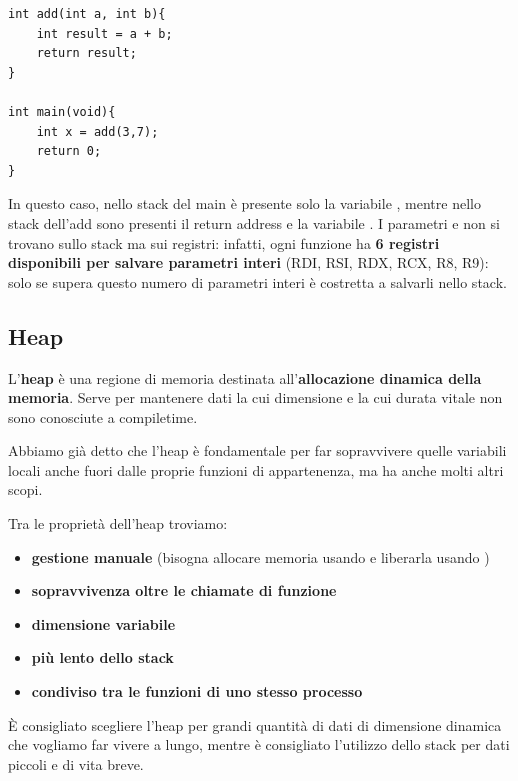 \documentclass[11pt, a4paper, titlepage, oneside]{scrbook}
\begin{document}
\begin{lstlisting}[style=C]
int add(int a, int b){
    int result = a + b;
    return result;
}

int main(void){
    int x = add(3,7);
    return 0;
}
\end{lstlisting}

In questo caso, nello stack del main è presente solo la variabile , mentre nello stack dell'add sono presenti il return address e la variabile . I parametri  e  non si trovano sullo stack ma sui registri: infatti, ogni funzione ha \textbf{6 registri disponibili per salvare parametri interi} (RDI, RSI, RDX, RCX, R8, R9): solo se supera questo numero di parametri interi è costretta a salvarli nello stack.

\subsection{Heap}

\begin{Definizione}[Heap]
\label{def-heap}
L'\textbf{heap} è una regione di memoria destinata all'\textbf{allocazione dinamica della memoria}. Serve per mantenere dati la cui dimensione e la cui durata vitale non sono conosciute a compiletime.
\end{Definizione}

Abbiamo già detto che l'heap è fondamentale per far sopravvivere quelle variabili locali anche fuori dalle proprie funzioni di appartenenza, ma ha anche molti altri scopi.

\begin{Proprieta}
\label{prop-proprieta-heap}
Tra le proprietà dell'heap troviamo:
\begin{itemize}
    \item \textbf{gestione manuale} (bisogna allocare memoria usando  e liberarla usando )
    \item \textbf{sopravvivenza oltre le chiamate di funzione}
    \item \textbf{dimensione variabile}
    \item \textbf{più lento dello stack}
    \item \textbf{condiviso tra le funzioni di uno stesso processo}
\end{itemize}
\end{Proprieta}

È consigliato scegliere l'heap per grandi quantità di dati di dimensione dinamica che vogliamo far vivere a lungo, mentre è consigliato l'utilizzo dello stack per dati piccoli e di vita breve.
\end{document}
